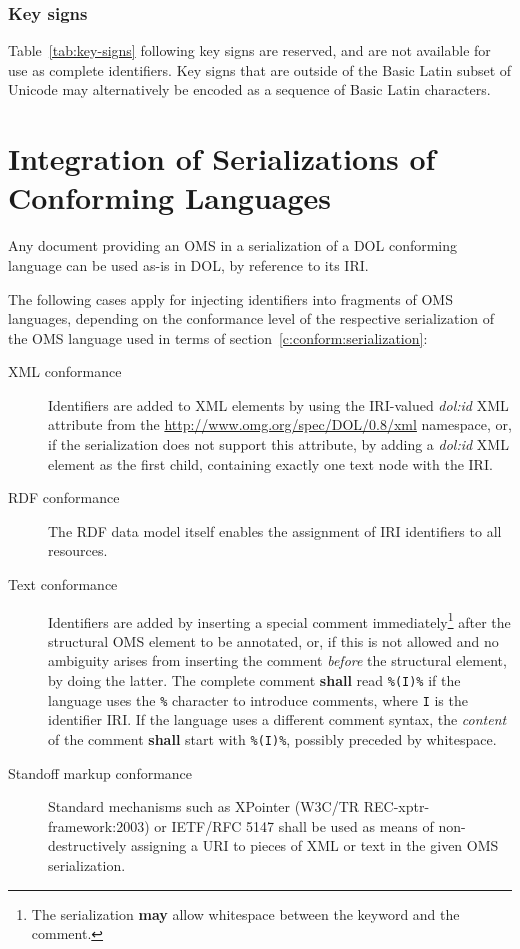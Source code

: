 \documentclass[10pt,fleqn,%
\ifpretendfinal
final%
\else
draft%
\fi,
]{scrreprt}
\newcommand*{\shall}{\textbf{shall}\xspace}
\newcommand*{\may}{\textbf{may}\xspace}
\newcommand{\sclause}[1]{\section{#1}}
\newcommand{\sssclause}[1]{\subsubsection{#1}}
\newcommand{\nisref}[1]{#1}
\begin{document}
\sssclause{Key signs}

Table~\ref{tab:key-signs} following key signs are reserved, and are not available for use as complete identifiers.  Key signs that are outside of the Basic Latin subset of Unicode may alternatively be encoded as a sequence of Basic Latin characters.


\sclause{Integration of Serializations of Conforming Languages}
\label{sec:existing-serialization}
Any document providing an OMS in a serialization of a DOL conforming
language can be used as-is in DOL, by reference to its IRI.

The following cases apply for injecting identifiers into fragments of OMS languages, depending on the conformance level of the respective serialization of the OMS language used in terms of section~\ref{c:conform:serialization}:
\begin{description}
\item[XML conformance] Identifiers are added to XML elements by using the IRI-valued \textit{dol:id} XML attribute from the \url{http://www.omg.org/spec/DOL/0.8/xml} namespace, or, if the serialization does not support this attribute, by adding a \textit{dol:id} XML element as the first child, containing exactly one text node with the IRI.
\item[RDF conformance] The RDF data model itself enables the assignment of IRI identifiers to all resources.
\item[Text conformance] Identifiers are added by inserting a special comment immediately\footnote{The serialization \may allow whitespace between the keyword and the comment.} after the structural OMS element to be annotated, or, if this is not allowed and no ambiguity arises from inserting the comment \emph{before} the structural element, by doing the latter.  The complete comment \shall read \texttt{\%(I)\%} if the language uses the \texttt{\%} character to introduce comments, where \texttt{I} is the identifier IRI.  If the language uses a different comment syntax, the \emph{content} of the comment \shall start with \texttt{\%(I)\%}, possibly preceded by whitespace.
\item[Standoff markup conformance] Standard mechanisms such as XPointer (\nisref{W3C/TR REC-xptr-framework:2003}) or \nisref{IETF/RFC 5147} shall be used as means of non-destructively assigning a URI to pieces of XML or text in the given OMS serialization.
\end{description}
\end{document}
